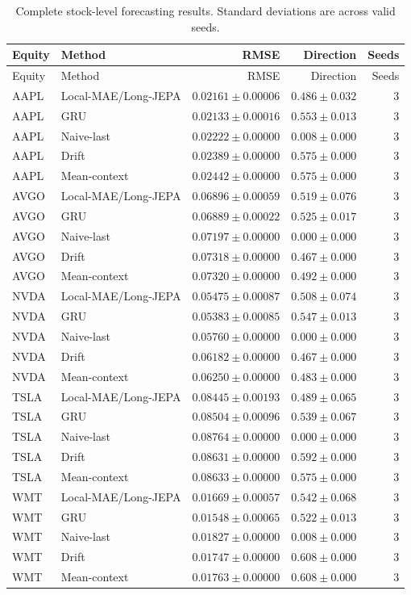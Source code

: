 \begin{longtable}{llrrr}
\caption{Complete stock-level forecasting results. Standard deviations are across valid seeds.}\label{tab:appendix_stock_metrics}\\
\toprule
Equity & Method & RMSE & Direction & Seeds \\
\midrule
\endfirsthead
\toprule
Equity & Method & RMSE & Direction & Seeds \\
\midrule
\endhead
AAPL & Local-MAE/Long-JEPA & $0.02161 \pm 0.00006$ & $0.486 \pm 0.032$ & 3 \\
AAPL & GRU & $0.02133 \pm 0.00016$ & $0.553 \pm 0.013$ & 3 \\
AAPL & Naive-last & $0.02222 \pm 0.00000$ & $0.008 \pm 0.000$ & 3 \\
AAPL & Drift & $0.02389 \pm 0.00000$ & $0.575 \pm 0.000$ & 3 \\
AAPL & Mean-context & $0.02442 \pm 0.00000$ & $0.575 \pm 0.000$ & 3 \\
AVGO & Local-MAE/Long-JEPA & $0.06896 \pm 0.00059$ & $0.519 \pm 0.076$ & 3 \\
AVGO & GRU & $0.06889 \pm 0.00022$ & $0.525 \pm 0.017$ & 3 \\
AVGO & Naive-last & $0.07197 \pm 0.00000$ & $0.000 \pm 0.000$ & 3 \\
AVGO & Drift & $0.07318 \pm 0.00000$ & $0.467 \pm 0.000$ & 3 \\
AVGO & Mean-context & $0.07320 \pm 0.00000$ & $0.492 \pm 0.000$ & 3 \\
NVDA & Local-MAE/Long-JEPA & $0.05475 \pm 0.00087$ & $0.508 \pm 0.074$ & 3 \\
NVDA & GRU & $0.05383 \pm 0.00085$ & $0.547 \pm 0.013$ & 3 \\
NVDA & Naive-last & $0.05760 \pm 0.00000$ & $0.000 \pm 0.000$ & 3 \\
NVDA & Drift & $0.06182 \pm 0.00000$ & $0.467 \pm 0.000$ & 3 \\
NVDA & Mean-context & $0.06250 \pm 0.00000$ & $0.483 \pm 0.000$ & 3 \\
TSLA & Local-MAE/Long-JEPA & $0.08445 \pm 0.00193$ & $0.489 \pm 0.065$ & 3 \\
TSLA & GRU & $0.08504 \pm 0.00096$ & $0.539 \pm 0.067$ & 3 \\
TSLA & Naive-last & $0.08764 \pm 0.00000$ & $0.000 \pm 0.000$ & 3 \\
TSLA & Drift & $0.08631 \pm 0.00000$ & $0.592 \pm 0.000$ & 3 \\
TSLA & Mean-context & $0.08633 \pm 0.00000$ & $0.575 \pm 0.000$ & 3 \\
WMT & Local-MAE/Long-JEPA & $0.01669 \pm 0.00057$ & $0.542 \pm 0.068$ & 3 \\
WMT & GRU & $0.01548 \pm 0.00065$ & $0.522 \pm 0.013$ & 3 \\
WMT & Naive-last & $0.01827 \pm 0.00000$ & $0.008 \pm 0.000$ & 3 \\
WMT & Drift & $0.01747 \pm 0.00000$ & $0.608 \pm 0.000$ & 3 \\
WMT & Mean-context & $0.01763 \pm 0.00000$ & $0.608 \pm 0.000$ & 3 \\
\bottomrule
\end{longtable}
